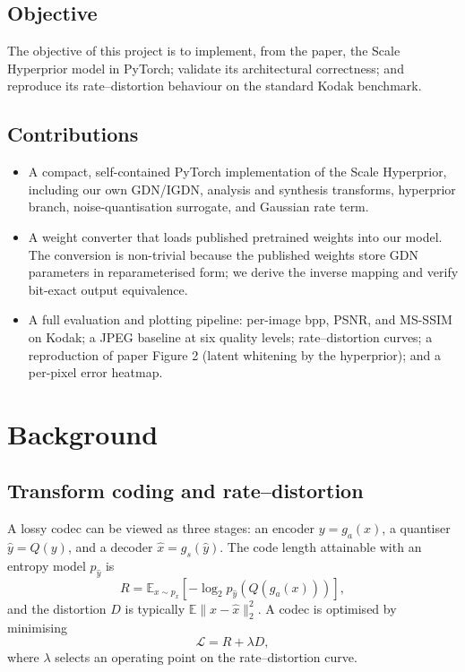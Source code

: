 \documentclass[review]{elsarticle}
\begin{document}
\subsection{Objective}
The objective of this project is to implement, from the paper, the Scale Hyperprior model in PyTorch; validate its architectural correctness; and reproduce its rate--distortion behaviour on the standard Kodak benchmark.

\subsection{Contributions}
\begin{itemize}
\item A compact, self-contained PyTorch implementation of the Scale Hyperprior, including our own GDN/IGDN, analysis and synthesis transforms, hyperprior branch, noise-quantisation surrogate, and Gaussian rate term.
\item A weight converter that loads published pretrained weights into our model. The conversion is non-trivial because the published weights store GDN parameters in reparameterised form; we derive the inverse mapping and verify bit-exact output equivalence.
\item A full evaluation and plotting pipeline: per-image bpp, PSNR, and MS-SSIM on Kodak; a JPEG baseline at six quality levels; rate--distortion curves; a reproduction of paper Figure 2 (latent whitening by the hyperprior); and a per-pixel error heatmap.
\end{itemize}

\section{Background}
\label{sec:background}

\subsection{Transform coding and rate--distortion}
A lossy codec can be viewed as three stages: an encoder $y = g_a(x)$, a quantiser $\hat y = Q(y)$, and a decoder $\hat x = g_s(\hat y)$. The code length attainable with an entropy model $p_{\hat y}$ is
\begin{equation}
R = \mathbb{E}_{x \sim p_x}\left[-\log_2 p_{\hat y}(Q(g_a(x)))\right],
\end{equation}
and the distortion $D$ is typically $\mathbb{E}\|x - \hat x\|_2^2$. A codec is optimised by minimising
\begin{equation}
\mathcal{L} = R + \lambda D,
\label{eq:rd}
\end{equation}
where $\lambda$ selects an operating point on the rate--distortion curve.
\end{document}
